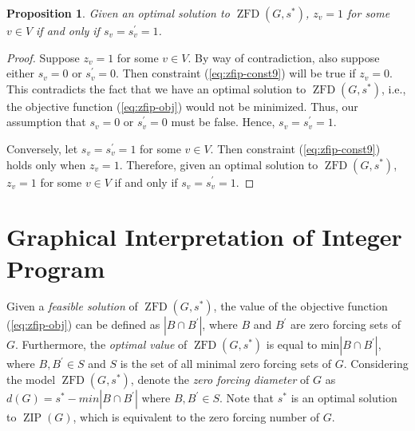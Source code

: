 \documentclass{article}
\newcommand\zip[1]{\operatorname{ZIP}\left(#1\right)}
\newcommand\zfd[1]{\operatorname{ZFD}\left(#1\right)}
\newtheorem{proposition}[theorem]{Proposition}
\theoremstyle{definition}
\begin{document}
\begin{proposition}
Given an optimal solution to $\zfd{G,s^{*}}$, $z_v = 1$ for some $v \in V$ if and only if $s_v = s_v^{'} = 1$.
\end{proposition}

\begin{proof}
Suppose $z_v = 1$ for some $v \in V$.
By way of contradiction, also suppose either $s_v = 0$ or $s_v^{'} = 0$.
Then constraint  (\ref{eq:zfip-const9}) will be true if $z_v = 0$.
This contradicts the fact that we have an optimal solution to $\zfd{G,s^{*}}$, i.e., the objective function (\ref{eq:zfip-obj}) would not be minimized.
Thus, our assumption that $s_v = 0$ or $s_v^{'} = 0$ must be false.
Hence, $s_v = s_v^{'} = 1$.

Conversely, let $s_v = s_v^{'} = 1$ for some $v \in V$.
Then constraint (\ref{eq:zfip-const9}) holds only when $z_v = 1$. 
Therefore, given an optimal solution to $\zfd{G,s^{*}}$, $z_v = 1$ for some $v \in V$ if and only if $s_v = s_v^{'} = 1$.
\end{proof}

\section{Graphical Interpretation of Integer Program}\label{sec:zfdiam}
 Given a \textit{feasible solution} of $\zfd{G,s^{*}}$, the value of the objective function (\ref{eq:zfip-obj}) can be defined as $|B \cap B^{'}|$, where $B$ and $B^{'}$ are zero forcing sets of $G$.
Furthermore, the \textit{optimal value} of $\zfd{G,s^{*}}$ is equal to $\text{min}|B \cap B^{'}|$, where $B,B^{'} \in S$ and $S$ is the set of all minimal zero forcing sets of $G$.
Considering the model $\zfd{G,s^{*}}$, denote the \textit{zero forcing diameter} of $G$ as $d(G) = s^{*} - min|B \cap B^{'}|$ where $B,B^{'} \in S$.
Note that $s^{*}$ is an optimal solution to $\zip{G}$, which is equivalent to the zero forcing number of $G$.

 
\end{document}

